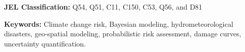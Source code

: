 \begin{titlepage}
\vspace{1.5em}

\textbf{JEL Classification:} Q54, Q51, C11, C150, C53, Q56, and D81

\vspace{0.5em}

\textbf{Keywords:} Climate change risk, Bayesian modeling, hydrometeorological disasters, geo-spatial modeling, probabilistic risk assessment, damage curves, uncertainty quantification.

\end{titlepage}
